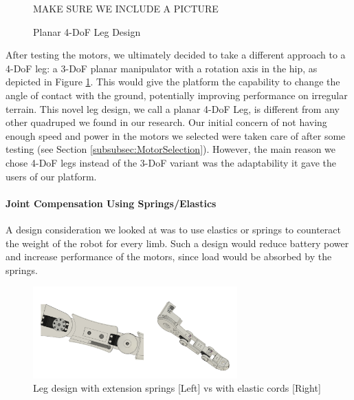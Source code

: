                 \begin{figure}
                    \centering
                    MAKE SURE WE INCLUDE A PICTURE
                    \caption{Planar 4-DoF Leg Design}
                    \label{fig:Planar4DoF}
                \end{figure}

                After testing the motors, we ultimately decided to take a different approach to a 4-DoF leg: a 3-DoF planar manipulator with a rotation axis in the hip, as depicted in Figure \ref{fig:Planar4DoF}. This would give the platform the capability to change the angle of contact with the ground, potentially improving performance on irregular terrain. This novel leg design, we call a planar 4-DoF Leg, is different from any other quadruped we found in our research. Our initial concern of not having enough speed and power in the motors we selected were taken care of after some testing (see Section \ref{subsubsec:MotorSelection}). However, the main reason we chose 4-DoF legs instead of the 3-DoF variant was the adaptability it gave the users of our platform.
            
            \paragraph{Joint Compensation Using Springs/Elastics} \label{par:JointElastics}
                A design consideration we looked at was to use elastics or springs to counteract the weight of the robot for every limb. Such a design would reduce battery power and increase performance of the motors, since load would be absorbed by the springs.

                \begin{figure}[H]
                    \centering
                    \includegraphics[width=0.7\textwidth]{figures/SpringVsElastics.png}
                    \caption{Leg design with extension springs [Left] vs with elastic cords [Right]}
                    \label{fig:SpringVsElastics}
                \end{figure}

